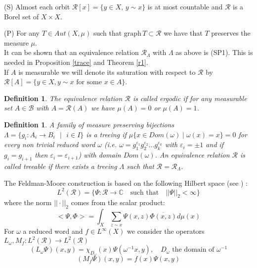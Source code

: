 \documentclass[12pt]{amsart}
\newtheorem{definition}[teo]{Definition}
\numberwithin{equation}{section}
\begin{document}
\vspace{0.09in}
\par (S) Almost each orbit $\mathcal{R}[x]=\{y\in X\mbox{, }y\sim x\}$ is at most countable and $\mathcal{R}$ is a Borel set of $X\times X$.
\par (P) For any $T\in Aut(X,\mu)$ such that $\mbox{graph}\,T\subset\mathcal{R}$ we have that $T$ preserves the measure $\mu$.
\vspace{0.09in}\\
It can be shown that an equivalence relation $\mathcal{R}_{\Lambda}$ with $\Lambda$ as above is (SP1). This is needed in Proposition \ref{trace} and Theorem \ref{r1}. \\ 
 If $A$ is measurable we will denote its \textsf{saturation} with respect to $\mathcal{R}$ by $\mathcal{R}[A]=\{y\in X, y\sim x\mbox{ for some }x\in A\}$.
\begin{definition}
The equivalence relation $\mathcal{R}$ is called \textsf{ergodic} if for any measurable set $A \in \mathcal{B}$ with $A=\mathcal{R}(A)$ we have $\mu(A)=0$ or $\mu(A)=1$.
\end{definition}
\begin{definition}
A family of measure preserving bijections  $\Lambda=\{g_i:A_i \to B_i\mbox{ }|\mbox{ }i\in I\}$ is a \textsf{treeing} if 
$\mu\{x\in Dom(\omega) \mid \omega(x)=x \}=0$ for every non trivial reduced word $\omega$  (i.e. $\omega=g_1^{\varepsilon_1}g_2^{\varepsilon_2}\ldots g_k^{\varepsilon_k}$ with $\varepsilon_i=\pm 1$ and if $g_i=g_{i+1}$ then $\varepsilon_i=\varepsilon_{i+1}$) with domain $Dom(\omega)$. 
An equivalence relation $\mathcal{R}$ is called \textsf{treeable} if there exists a treeing $\Lambda$ such that $\mathcal{R}=\mathcal{R}_{\Lambda}$.  
\end{definition}
The Feldman-Moore construction is based on the following Hilbert space (see \cite{FMII} ) :
\[
L^2(\mathcal{R})=\{\Psi : \mathcal{R} \to \mathbb{C} \quad \text{such that}\quad ||\Psi||_2<\infty \}
\]
where the norm $||\cdot||_2$ comes from the scalar product:
\[
<\Psi,\Phi>= \int_X \sum_{z\sim x} \Psi(x,z) \overline{\Phi(x,z)} d\mu(x)
\]
For $\omega$ a reduced word and $f \in L^{\infty}(X)$ we consider the operators\\ $L_{\omega},M_f:L^2(\mathcal{R}) \to L^2(\mathcal{R})$
\begin{equation}
(L_{\omega}\Psi)(x,y)=\chi_{D_{\omega}}(x)\Psi(\omega^{-1}x,y),\quad D_{\omega}\mbox{ the domain of }\omega^{-1}
\end{equation}
\begin{equation}
(M_f\Psi)(x,y)=f(x)\Psi(x,y)
\end{equation}
\end{document}
